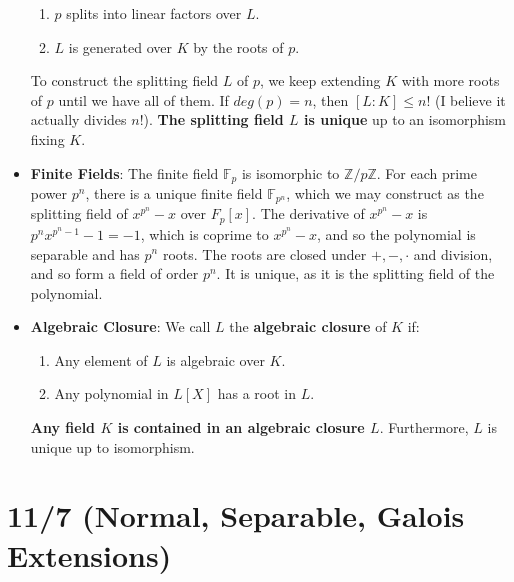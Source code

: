 \documentclass[11pt, oneside]{amsart}   	%
\theoremstyle{definition}
\begin{document}
\begin{itemize}
	\begin{enumerate}
		
		\item $p$ splits into linear factors over $L$.
		
		\item $L$ is generated over $K$ by the roots of $p$.
		
	\end{enumerate}
	
	To construct the splitting field $L$ of $p$, we keep extending $K$ with more roots of $p$ until we have all of them. If $deg(p) = n$, then $[L : K] \leq n!$ 
	(I believe it actually divides $n!$). \textbf{The splitting field $L$ is unique} up to an isomorphism fixing $K$.
	
	\item \textbf{Finite Fields}: The finite field $\mathbb F_p$ is isomorphic to $\mathbb Z / p\mathbb Z$. For each prime power $p^n$, there is a unique 
	finite field $\mathbb F_{p^n}$, which we may construct as the splitting field of $x^{p^n} - x$ over $F_p[x]$. The derivative of $x^{p^n} - x$ is $p^nx^{p^n 
	- 1} - 1 = -1$, which is coprime to $x^{p^n} - x$, and so the polynomial is separable and has $p^n$ roots. The roots are closed under $+, -, \cdot$ and 
	division, and so form a field of order $p^n$. It is unique, as it is the splitting field of the polynomial. 
	
	\item \textbf{Algebraic Closure}: We call $L$ the \textbf{algebraic closure} of $K$ if:
	
	\begin{enumerate}
	
		\item Any element of $L$ is algebraic over $K$.
		
		\item Any polynomial in $L[X]$ has a root in $L$. 
	
	\end{enumerate}
	
	\textbf{Any field $K$ is contained in an algebraic closure $L$}. Furthermore, $L$ is unique up to isomorphism.

\end{itemize}

\section{11/7 (Normal, Separable, Galois Extensions)}
\end{document}
